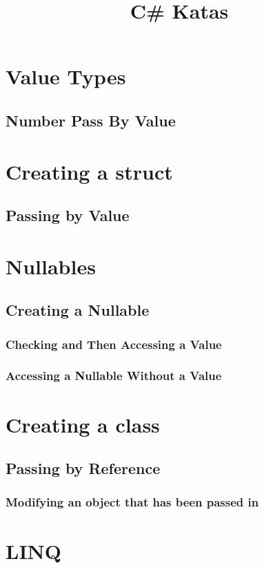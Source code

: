 \documentclass {amsart}
\title{C\# Katas}
\begin{document}
\maketitle

\section{Value Types}
	\subsection{Number Pass By Value}

\section{Creating a struct}
	\subsection{Passing by Value}

\section{Nullables}
	\subsection{Creating a Nullable}
		\subsubsection{Checking and Then Accessing a Value}
		\subsubsection{Accessing a Nullable Without a Value}

\section{Creating a class}
	\subsection{Passing by Reference}
		\subsubsection{Modifying an object that has been passed in}
\section{LINQ}
\end{document}
